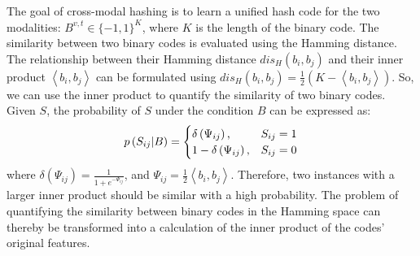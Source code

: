 \documentclass[10pt,twocolumn,letterpaper]{article}
\begin{document}
The goal of cross-modal hashing is to learn a unified hash code for the two modalities: $B^{v,t} \in \{-1,1\}^{K}$, where $K$ is the length of the binary code. The similarity between two binary codes is evaluated using the Hamming distance. The relationship between their Hamming distance $dis_{H}(b_{i},b_{j})$ and their inner product $\left<b_{i},b{_j}\right>$ can be formulated using $dis_{H}(b_{i},b_{j}) = \frac{1}{2}(K-\left<b_{i},b{_j}\right>)$.
So, we can use the inner product to quantify the similarity of two binary codes. Given $S$, the probability of $S$ under the condition $B$ can be expressed as:
\vspace{-0.2cm}
\begin{equation} \label{eq:loglikehood}
\begin{aligned}
p\left( { S }_{ ij }| B \right) =\begin{cases} \delta \left( { \Psi  }_{ ij } \right) \text{,}& { S }_{ ij }=1 \\ 1-\delta \left( { \Psi  }_{ ij } \right) \text{,}& { S }_{ ij }=0 \end{cases}
\end{aligned}
\vspace{-0.1cm}
\end{equation}
where $\delta \left( {\Psi}_{ ij } \right)=\frac{1}{1+e^{-{\Psi }_{ ij }}}$, and ${\Psi}_{ij}=\frac{1}{2}\left<b_{i},b{_j}\right>$. Therefore, two instances with a larger inner product should be similar with a high probability. The problem of quantifying the similarity between binary codes in the Hamming space can thereby be transformed into a calculation of the inner product of the codes' original features.
\end{document}
